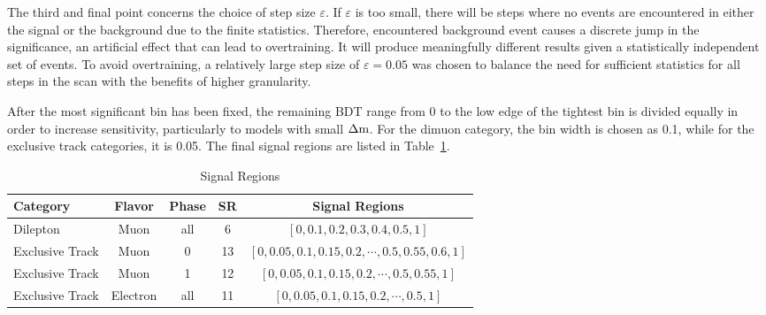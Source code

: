 The third and final point concerns the choice of step size $\varepsilon$. If $\varepsilon$ is too small, there will be steps where no events are encountered in either the signal or the background due to the finite statistics. Therefore, encountered background event causes a discrete jump in the significance, an artificial effect that can lead to overtraining. It will produce meaningfully different results given a statistically independent set of events. To avoid overtraining, a relatively large step size of $\varepsilon=0.05$ was chosen to balance the need for sufficient statistics for all steps in the scan with the benefits of higher granularity.

After the most significant bin has been fixed, the remaining BDT range from 0 to the low edge of the tightest bin is divided equally in order to increase sensitivity, particularly to models with small $\Delta\mathrm{m}$. For the dimuon category, the bin width is chosen as 0.1, while for the exclusive track categories, it is 0.05. The final signal regions are listed in Table~\ref{tab:signal-regions}.

\begin{table}[hp]
	\centering
	\label{tab:signal-regions}
		\caption{Signal Regions}
			\begin{tabular}{lcccc} \hline
			Category & Flavor & Phase & SR & Signal Regions \\ \hline
			Dilepton & Muon & all &  6 & $[0,0.1,0.2,0.3,0.4,0.5,1]$ \\
			
			Exclusive Track & Muon & 0 & 13 & $[0,0.05,0.1,0.15,0.2,\cdots,0.5,0.55,0.6,1]$ \\ 
			Exclusive Track & Muon & 1 & 12 & $[0,0.05,0.1,0.15,0.2,\cdots,0.5,0.55,1]$ \\	
			Exclusive Track & Electron & all & 11 & $[0,0.05,0.1,0.15,0.2,\cdots,0.5,1]$ \\			
			
			\hline
			\end{tabular}
\end{table}
